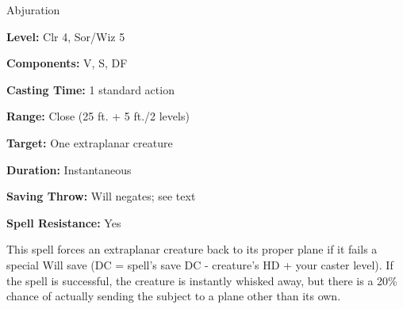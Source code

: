 
Abjuration

\textbf{Level:} Clr 4, Sor/Wiz 5

\textbf{Components:} V, S, DF

\textbf{Casting Time:} 1 standard action

\textbf{Range:} Close (25 ft. + 5 ft./2 levels)

\textbf{Target:} One extraplanar creature

\textbf{Duration:} Instantaneous

\textbf{Saving Throw:} Will negates; see text

\textbf{Spell Resistance:} Yes

This spell forces an extraplanar creature back to its proper plane if it fails 
a special Will save (DC = spell's save DC - creature's HD + your caster level). 
If the spell is successful, the creature is instantly whisked away, but there is 
a 20\% chance of actually sending the subject to a plane other than its own.

